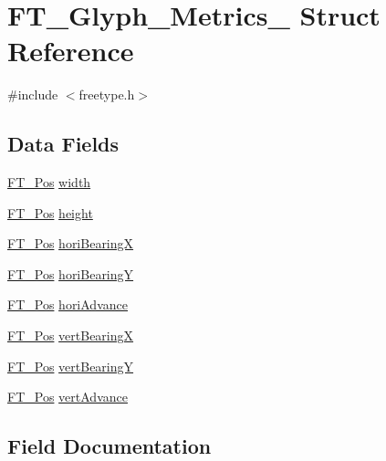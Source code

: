 \hypertarget{struct_f_t___glyph___metrics__}{}\section{F\+T\+\_\+\+Glyph\+\_\+\+Metrics\+\_\+ Struct Reference}
\label{struct_f_t___glyph___metrics__}


{\ttfamily \#include $<$freetype.\+h$>$}

\subsection*{Data Fields}
\begin{DoxyCompactItemize}
\item 
\hyperlink{ftimage_8h_af5f230f4b253d4c7715fd2e595614c90}{F\+T\+\_\+\+Pos} \hyperlink{struct_f_t___glyph___metrics___a0ff1be869e6a28d1f2990b0e5719dca9}{width}
\item 
\hyperlink{ftimage_8h_af5f230f4b253d4c7715fd2e595614c90}{F\+T\+\_\+\+Pos} \hyperlink{struct_f_t___glyph___metrics___aa2a76ec448ec9d18acf343f01b77cb21}{height}
\item 
\hyperlink{ftimage_8h_af5f230f4b253d4c7715fd2e595614c90}{F\+T\+\_\+\+Pos} \hyperlink{struct_f_t___glyph___metrics___a2afc877f52c8a8910ec144a1948186cc}{hori\+BearingX}
\item 
\hyperlink{ftimage_8h_af5f230f4b253d4c7715fd2e595614c90}{F\+T\+\_\+\+Pos} \hyperlink{struct_f_t___glyph___metrics___afd97c10d43ed1f66598a18884468b536}{hori\+BearingY}
\item 
\hyperlink{ftimage_8h_af5f230f4b253d4c7715fd2e595614c90}{F\+T\+\_\+\+Pos} \hyperlink{struct_f_t___glyph___metrics___af12db260a90b8a7c938ad48ebf20ccbe}{hori\+Advance}
\item 
\hyperlink{ftimage_8h_af5f230f4b253d4c7715fd2e595614c90}{F\+T\+\_\+\+Pos} \hyperlink{struct_f_t___glyph___metrics___aead5c5637b983b811738bff3bcea8cea}{vert\+BearingX}
\item 
\hyperlink{ftimage_8h_af5f230f4b253d4c7715fd2e595614c90}{F\+T\+\_\+\+Pos} \hyperlink{struct_f_t___glyph___metrics___a7f1aba91b86fddeb11030eab15dcce08}{vert\+BearingY}
\item 
\hyperlink{ftimage_8h_af5f230f4b253d4c7715fd2e595614c90}{F\+T\+\_\+\+Pos} \hyperlink{struct_f_t___glyph___metrics___a594f43c64fe5c12a399a0f0a47c04990}{vert\+Advance}
\end{DoxyCompactItemize}


\subsection{Field Documentation}
\mbox{\label{struct_f_t___glyph___metrics___aa2a76ec448ec9d18acf343f01b77cb21}} 
